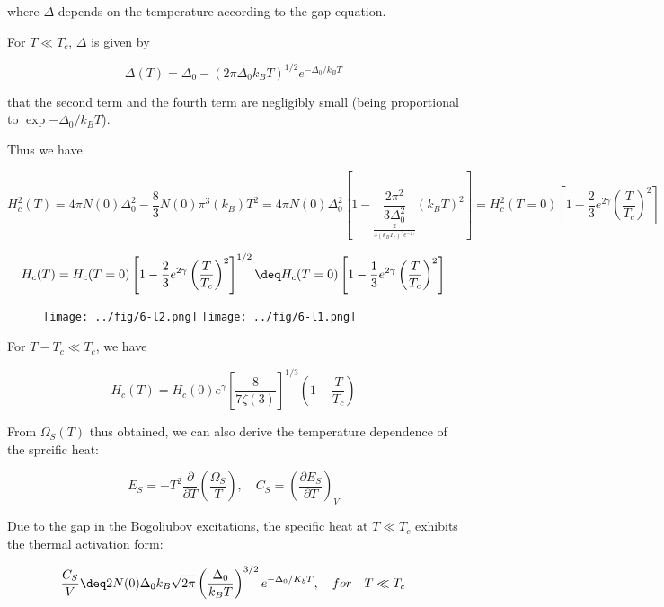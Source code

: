 where $\Delta$ depends on the temperature according to the gap equation. 

For $T\ll T_c$, $\Delta$ is given by 

\[\Delta(T) =\Delta_0-(2\pi\Delta_0 k_BT)^{1/2}e^{-\Delta_0/k_BT} \]

that the second term and the fourth term are negligibly small (being proportional to $\exp{-\Delta_0/k_BT}$). 

Thus we have

\[H_c^2(T) = 4\pi N(0)\Delta_0^2-\frac{8}{3}N(0)\pi^3 (k_B)T^2  = 4\pi N(0)\Delta_0^2\left[1 - \underset{\frac{2}{3(k_BT_c)^2 e^{-2\gamma}}}{\frac{2\pi^2}{3\Delta_0^2}}(k_BT)^2\right] = H_c^2(T=0)\left[ 1 - \frac{2}{3} e^{2\gamma}\left(\frac{T}{T_c}\right)^2\right]\]

\[H_c(T) = H_c(T=0)\left[ 1 - \frac{2}{3} e^{2\gamma}\left(\frac{T}{T_c}\right)^2\right]^{1/2} \deq H_c(T=0)\left[ 1 - \frac{1}{3} e^{2\gamma}\left(\frac{T}{T_c}\right)^2\right] \]

\begin{wrapfigure}{l}{6cm}
\texttt{[image: ../fig/6-l2.png]}
\texttt{[image: ../fig/6-l1.png]}
\end{wrapfigure}



For $T-T_c\ll T_c$, we have

\[H_c(T)=H_c(0)e^\gamma \left[\frac{8}{7\zeta(3)}\right]^{1/3}\left(1-\frac{T}{T_c}\right) \]

From $\Omega_S(T)$ thus obtained, we can also derive the temperature dependence of the sprcific heat:

\[E_S=-T^2\frac{\partial}{\partial T}\left(\frac{\Omega_S}{T}\right),\quad C_S=\left(\frac{\partial E_S}{\partial T}\right)_V \]

Due to the gap in the Bogoliubov excitations, the specific heat at $T\ll T_c$ exhibits the thermal activation form:

\[\frac{C_S}{V}\deq 2N(0)\Delta_0 k_B\sqrt{2\pi}\left(\frac{\Delta_0}{k_B T}\right)^{3/2}e^{-\Delta_0/K_bT},\quad for\quad T\ll T_c \]


